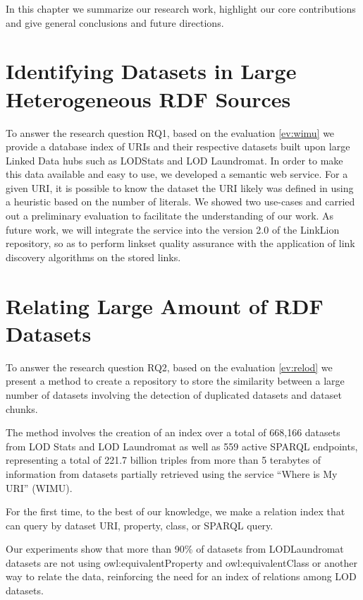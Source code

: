 In this chapter we summarize our research work, highlight our core contributions and give general conclusions and future directions.

\section{Identifying Datasets in Large Heterogeneous RDF Sources}
To answer the research question RQ1, based on the evaluation \ref{ev:wimu} we provide a database index of URIs and their respective datasets built upon large Linked Data hubs such as LODStats and LOD Laundromat.
In order to make this data available and easy to use, we developed a semantic web service.
For a given URI, it is possible to know the dataset the URI likely was defined in using a heuristic based on the number of literals. 
We showed two use-cases and carried out a preliminary evaluation to facilitate the understanding of our work.
As future work, we will integrate the service into the version 2.0 of the LinkLion repository, so as to perform linkset quality assurance with the application of link discovery algorithms on the stored links.

\section{Relating Large Amount of RDF Datasets}
To answer the research question RQ2, based on the evaluation \ref{ev:relod} we present a method to create a repository to store the similarity between a large number of datasets involving the detection of duplicated datasets and dataset chunks.

The method involves the creation of an index over a total of 668,166 datasets from LOD Stats and LOD Laundromat as well as 559 active SPARQL endpoints, representing a total of 221.7 billion triples from more than 5 terabytes of information from datasets partially retrieved using the service ``Where is My URI'' (WIMU). 

For the first time, to the best of our knowledge, we make a relation index that can query by dataset URI, property, class, or SPARQL query.

Our experiments show that more than 90\% of datasets from LODLaundromat datasets are not using owl:equivalentProperty and owl:equivalentClass or another way to relate the data, reinforcing the need for an index of relations among LOD datasets.

